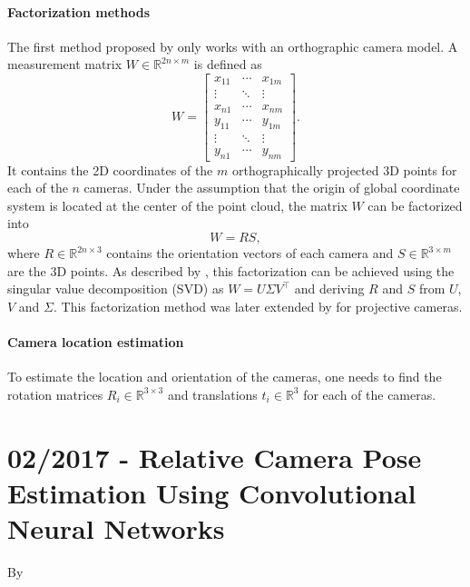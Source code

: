         	\paragraph{Factorization methods}
        		The first method proposed by \cite{tomasi1992factorization} only works with an orthographic camera model.
        		A measurement matrix $W \in \mathbb{R}^{2n \times m}$ is defined as
        		\begin{equation}
        			W =
        			\begin{bmatrix}
        			x_{11} & \cdots & x_{1m} \\ 
        			\vdots & \ddots & \vdots \\ 
        			x_{n1} & \cdots & x_{nm} \\ 
        			y_{11} & \cdots & y_{1m} \\ 
        			\vdots & \ddots  & \vdots \\ 
        			y_{n1} & \cdots & y_{nm}
        			\end{bmatrix}. 
        		\end{equation}
        		It contains the 2D coordinates of the $m$ orthographically projected 3D points for each of the $n$ cameras.
        		Under the assumption that the origin of global coordinate system is located at the center of the point cloud, the matrix $W$ can be factorized into
        		\begin{equation}
        			W = RS,
        		\end{equation}
        		where $R \in \mathbb{R}^{2n \times 3}$ contains the orientation vectors of each camera and $S \in \mathbb{R}^{3 \times m}$  are the 3D points.
        		As described by \cite{tomasi1992factorization}, this factorization can be achieved using the singular value decomposition (SVD) as $W = U \varSigma V^\top$ and deriving $R$ and $S$ from $U$, $V$ and $\varSigma$.
        		This factorization method was later extended by \cite{sturm1996factorization} for projective cameras.
        		
        	\paragraph{Camera location estimation}
        		To estimate the location and orientation of the cameras, one needs to find the rotation matrices $R_i \in \mathbb{R}^{3 \times 3}$ and translations $t_i \in \mathbb{R}^{3}$ for each of the cameras.
        	
        	
        \section{02/2017 - Relative Camera Pose Estimation Using Convolutional Neural Networks}
        By \cite{melekhov2017poseCNN}
        \\
        
        
        